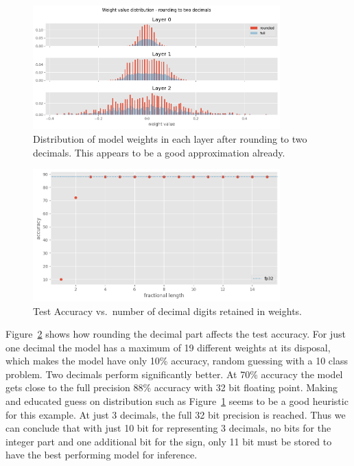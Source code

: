 \documentclass[11pt]{article}
\begin{document}
\begin{figure}[H]
	\centering
	\includegraphics[width=0.85\textwidth]{figures/118_dist2.png}
	\caption{Distribution of model weights in each layer after rounding to two decimals.
		This appears to be a good approximation already.}
	\label{fig:118_2}
\end{figure}

\begin{figure}[H]
	\centering
	\includegraphics[width=0.85\textwidth]{figures/118_accuracy.png}
	\caption{Test Accuracy vs.\ number of decimal digits retained in weights.}
	\label{fig:118_acc}
\end{figure}

Figure~\ref{fig:118_acc} shows how rounding the decimal part affects the test
accuracy. For just one decimal the model has a maximum of 19 different weights
at its disposal, which makes the model have only 10\% accuracy, random guessing
with a 10 class problem. Two decimals perform significantly better. At 70\%
accuracy the model gets close to the full precision 88\% accuracy with 32 bit
floating point. Making and educated guess on distribution such as
Figure~\ref{fig:118_2} seems to be a good heuristic for this example. At just 3
decimals, the full 32 bit precision is reached. Thus we can conclude that with
just 10 bit for representing 3 decimals, no bits for the integer part and one
additional bit for the sign, only 11 bit must be stored to have the best
performing model for inference.
\end{document}
